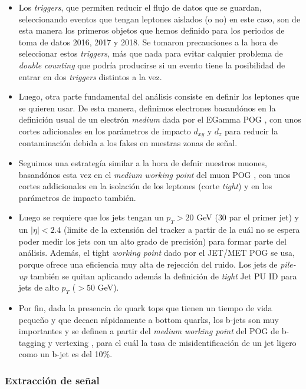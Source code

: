 \documentclass[a4paper, 10pt, openright]{report}
\begin{document}
\begin{appendices}
\begin{itemize}
\item Los \textit{triggers}, que permiten reducir el flujo de datos que se guardan, seleccionando eventos que tengan leptones aislados (o no) en este caso, son de esta manera los primeros objetos que hemos definido para los periodos de toma de datos 2016, 2017 y 2018. Se tomaron precauciones a la hora de seleccionar estos \textit{triggers}, m\'{a}s que nada para evitar calquier problema de \textit{double counting} que podr\'{i}a producirse si un evento tiene la posibilidad de entrar en dos \textit{triggers} distintos a la vez. 
\item Luego, otra parte fundamental del an\'{a}lisis consiste en definir los leptones que se quieren usar. De esta manera, definimos electrones basand\'{o}nos en la definici\'{o}n usual de un electr\'{o}n \textit{medium} dada por el EGamma \ac{POG} \cite{ElePOG}, con unos cortes adicionales en los par\'{a}metros de impacto $d_{xy}$ y $d_z$ para reducir la contaminaci\'{o}n debida a los fakes en nuestras zonas de se\~{n}al. 
\item Seguimos una estrateg\'{i}a similar a la hora de defnir nuestros muones, basand\'{o}nos esta vez en el \textit{medium working point} del muon \ac{POG} \cite{MuonPOG}, con unos cortes addicionales en la isolaci\'{o}n de los leptones (corte \textit{tight}) y en los par\'{a}metros de impacto tambi\'{e}n.
\item Luego se requiere que los jets tengan un $p_T > 20$ GeV ($30$ par el primer jet) y un $|\eta| < 2.4$ (limite de la extensi\'{o}n del tracker a partir de la cu\'{a}l no se espera poder medir los jets con un alto grado de precisi\'{o}n) para formar parte del an\'{a}lisis. Adem\'{a}s, el tight \textit{working point} dado por el JET/MET \ac{POG} \cite{JETMETPOG} se usa, porque ofrece una eficiencia muy alta de rejecci\'{o}n del ruido. Los jets de \textit{pile-up} tambi\'{e}n se quitan aplicando adem\'{a}s la definici\'{o}n de \textit{tight} Jet \ac{PU} ID para jets de alto $p_T$ ($> 50$ GeV).
\item Por fin, dada la presencia de quark tops que tienen un tiempo de vida peque\~{n}o y que decaen r\'{a}pidamente a bottom quarks, los b-jets son muy importantes y se definen a partir del \textit{medium working point} del \ac{POG} de b-tagging y vertexing \cite{BTagPOG}, para el cu\'{a}l la tasa de misidentificaci\'{o}n de un jet ligero como un b-jet es del 10\%.
\end{itemize}

\subsubsection{Extracci\'{o}n de se\~{n}al}


\end{appendices}
\end{document}
